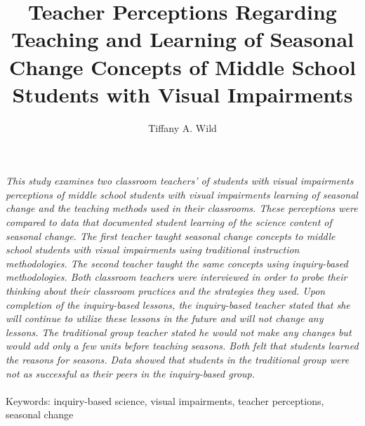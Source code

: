\documentclass[11.5pt]{sig-alternate} %
\makeatletter
\let\oldabstract\abstract
\let\oldendabstract\endabstract
\renewenvironment{abstract} %
{\renewenvironment{quotation}%
               {\list{}{\addtolength{\leftmargin}{1em} %
                        \listparindent 1.5em%
                        \itemindent    \listparindent%
                        \rightmargin   \leftmargin%
                        \parsep        \z@ \@plus\p@}%
                \item\relax}%
               {\endlist}%
\oldabstract}
{\oldendabstract}
\makeatother
\begin{document}
\title{Teacher Perceptions Regarding Teaching and Learning of Seasonal Change Concepts of Middle School Students with Visual Impairments}

\author[1]{\large \color{blue}Tiffany A. Wild}


\toappear{}
\maketitle
\begin{@twocolumnfalse} 
\begin{abstract}
\item 
\textit{This study examines two classroom teachers’ of students with visual impairments perceptions of middle school students with visual impairments learning of seasonal change and the teaching methods used in their classrooms.  These perceptions were compared to data that documented student learning of the science content of seasonal change.  The first teacher taught seasonal change concepts to middle school students with visual impairments using traditional instruction methodologies.  The second teacher taught the same concepts using inquiry-based methodologies.   Both classroom teachers were interviewed in order to probe their thinking about their classroom practices and the strategies they used.  Upon completion of the inquiry-based lessons, the inquiry-based teacher stated that she will continue to utilize these lessons in the future and will not change any lessons. The traditional group teacher stated he would not make any changes but would add only a few units before teaching seasons. Both felt that students learned the reasons for seasons. Data showed that students in the traditional group were not as successful as their peers in the inquiry-based group.}
\\ \\
Keywords: inquiry-based science, visual impairments, teacher perceptions, seasonal change
\end{abstract}
\end{@twocolumnfalse}

\end{document}
